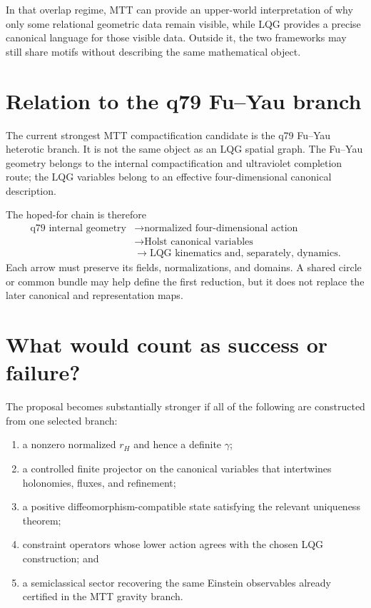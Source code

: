 \documentclass[11pt]{article}
\begin{document}
In that overlap regime, MTT can provide an upper-world interpretation of why
only some relational geometric data remain visible, while LQG provides a
precise canonical language for those visible data. Outside it, the two
frameworks may still share motifs without describing the same mathematical
object.

\section{Relation to the q79 Fu--Yau branch}

The current strongest MTT compactification candidate is the q79 Fu--Yau
heterotic branch. It is not the same object as an LQG spatial graph. The
Fu--Yau geometry belongs to the internal compactification and ultraviolet
completion route; the LQG variables belong to an effective
four-dimensional canonical description.

The hoped-for chain is therefore
\[
\begin{aligned}
 \text{q79 internal geometry}
 &\longrightarrow \text{normalized four-dimensional action}\\
 &\longrightarrow \text{Holst canonical variables}\\
 &\longrightarrow \text{LQG kinematics and, separately, dynamics}.
\end{aligned}
\]
Each arrow must preserve its fields, normalizations, and domains. A shared
circle or common bundle may help define the first reduction, but it does not
replace the later canonical and representation maps.

\section{What would count as success or failure?}

The proposal becomes substantially stronger if all of the following are
constructed from one selected branch:
\begin{enumerate}
\item a nonzero normalized \(r_H\) and hence a definite \(\gamma\);
\item a controlled finite projector on the canonical variables that
  intertwines holonomies, fluxes, and refinement;
\item a positive diffeomorphism-compatible state satisfying the relevant
  uniqueness theorem;
\item constraint operators whose lower action agrees with the chosen LQG
  construction; and
\item a semiclassical sector recovering the same Einstein observables already
  certified in the MTT gravity branch.
\end{enumerate}
\end{document}
